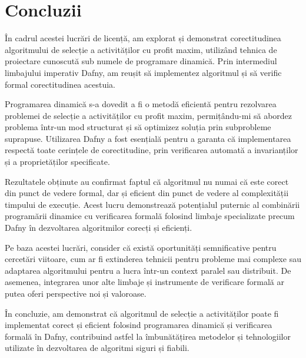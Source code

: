\chapter*{Concluzii} 
În cadrul acestei lucrări de licență, am explorat și demonstrat corectitudinea algoritmului de selecție a activităților cu profit maxim, utilizând tehnica de proiectare cunoscută sub numele de programare dinamică. Prin intermediul limbajului imperativ Dafny, am reușit să implementez algoritmul și să verific formal corectitudinea acestuia.

Programarea dinamică s-a dovedit a fi o metodă eficientă pentru rezolvarea problemei de selecție a activităților cu profit maxim, permițându-mi să abordez problema într-un mod structurat și să optimizez soluția prin subprobleme suprapuse. Utilizarea Dafny a fost esențială pentru a garanta că implementarea respectă toate cerințele de corectitudine, prin verificarea automată a invarianților și a proprietăților specificate.

Rezultatele obținute au confirmat faptul că algoritmul nu numai că este corect din punct de vedere formal, dar și eficient din punct de vedere al complexității timpului de execuție. Acest lucru demonstrează potențialul puternic al combinării programării dinamice cu verificarea formală folosind limbaje specializate precum Dafny în dezvoltarea algoritmilor corecți și eficienți.

Pe baza acestei lucrări, consider că există oportunități semnificative pentru cercetări viitoare, cum ar fi extinderea tehnicii pentru probleme mai complexe sau adaptarea algoritmului pentru a lucra într-un context paralel sau distribuit. De asemenea, integrarea unor alte limbaje și instrumente de verificare formală ar putea oferi perspective noi și valoroase.

În concluzie, am demonstrat că algoritmul de selecție a activităților poate fi implementat corect și eficient folosind programarea dinamică și verificarea formală în Dafny, contribuind astfel la îmbunătățirea metodelor și tehnologiilor utilizate în dezvoltarea de algoritmi siguri și fiabili.